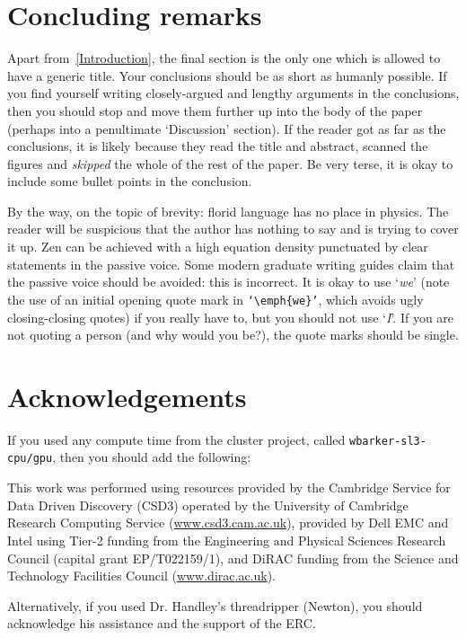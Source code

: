 \documentclass[aps,prd,reprint,preprintnumbers,showpacs,floatfix,nofootinbib,superscript address]{revtex4-2}
\begin{document}
\section{Concluding remarks}\label{ConcludingRemarks}

Apart from~\cref{Introduction}, the final section is the only one which is allowed to have a generic title. Your conclusions should be as short as humanly possible. If you find yourself writing closely-argued and lengthy arguments in the conclusions, then you should stop and move them further up into the body of the paper (perhaps into a penultimate `Discussion' section). If the reader got as far as the conclusions, it is likely because they read the title and abstract, scanned the figures and \emph{skipped} the whole of the rest of the paper. Be very terse, it is okay to include some bullet points in the conclusion. 

By the way, on the topic of brevity: florid language has no place in physics. The reader will be suspicious that the author has nothing to say and is trying to cover it up. Zen can be achieved with a high equation density punctuated by clear statements in the passive voice. Some modern graduate writing guides claim that the passive voice should be avoided: this is incorrect. It is okay to use `\emph{we}' (note the use of an initial opening quote mark in \texttt{`\textbackslash emph\{we\}'}, which avoids ugly closing-closing quotes) if you really have to, but you should not use `\emph{I}'. If you are not quoting a person (and why would you be?), the quote marks should be single.

\section{Acknowledgements}

If you used any compute time from the cluster project, called \texttt{wbarker-sl3-cpu/gpu}, then you should add the following:

This work was performed using resources provided by the Cambridge Service for Data Driven Discovery (CSD3) operated by the University of Cambridge Research Computing Service (\href{www.csd3.cam.ac.uk}{www.csd3.cam.ac.uk}), provided by Dell EMC and Intel using Tier-2 funding from the Engineering and Physical Sciences Research Council (capital grant EP/T022159/1), and DiRAC funding from the Science and Technology Facilities Council (\href{www.dirac.ac.uk}{www.dirac.ac.uk}).

Alternatively, if you used Dr. Handley's threadripper (Newton), you should acknowledge his assistance and the support of the ERC.
\end{document}
